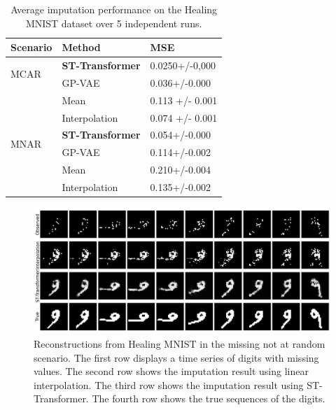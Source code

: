 \documentclass[11pt]{article}
\begin{document}
\begin{table}[h!]
    \centering
    \begin{tabularx}{\textwidth}{XXX}
        \toprule
        Scenario&Method & MSE \\
        \midrule
        \multirow{2}{*}{MCAR}&\textbf{ST-Transformer} & 0.0250+/-0,000   \\

        &GP-VAE& 0.036+/-0.000\\
        &Mean&0.113 +/- 0.001\\
        &Interpolation&0.074 +/- 0.001\\
        
        \midrule
          \multirow{2}{*}{MNAR}&\textbf{ST-Transformer} & 0.054+/-0.000  \\
        &GP-VAE&0.114+/-0.002\\
        &Mean&0.210+/-0.004\\
        &Interpolation& 0.135+/-0.002\\
        \bottomrule

        
    \end{tabularx}
    \caption{Average imputation performance on the Healing MNIST dataset over 5 independent runs.}
    \label{tab: healing_mnist}
\end{table}





\begin{figure}[H]
\centering
\includegraphics[width=\textwidth]{figure/healing_mnist.png}
\caption{Reconstructions from Healing MNIST in the missing not at random scenario. The first row displays a time series of digits with missing values. The second row shows the imputation result using linear interpolation. The third row shows the imputation result using ST-Transformer. The fourth row shows the true sequences of the digits.}
\label{fig: healing_mnist}
\end{figure}
\end{document}
